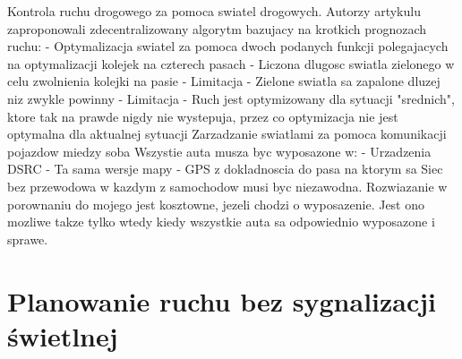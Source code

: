 \newline
\newline
Kontrola ruchu drogowego za pomoca swiatel drogowych. Autorzy artykulu \cite{lammer2008self} zaproponowali zdecentralizowany algorytm bazujacy na krotkich prognozach ruchu:
  \newline
  - Optymalizacja swiatel za pomoca dwoch podanych funkcji polegajacych na optymalizacji kolejek na czterech pasach
  - Liczona dlugosc swiatla zielonego w celu zwolnienia kolejki na pasie
  \newline
  - Limitacja - Zielone swiatla sa zapalone dluzej niz zwykle powinny
  \newline
  - Limitacja - Ruch jest optymizowany dla sytuacji "srednich", ktore tak na prawde nigdy nie wystepuja, przez co optymizacja nie jest optymalna dla aktualnej sytuacji
  \newline
  \newline
Zarzadzanie swiatlami za pomoca komunikacji pojazdow miedzy soba \cite{ferreira2010self}
\newline
Wszystie auta musza byc wyposazone w:
\newline
  - Urzadzenia DSRC
\newline
  - Ta sama wersje mapy
\newline
  - GPS z dokladnoscia do pasa na ktorym sa
\newline
Siec bez przewodowa w kazdym z samochodow musi byc niezawodna.
\newline
Rozwiazanie w porownaniu do mojego jest kosztowne, jezeli chodzi o wyposazenie. Jest ono mozliwe takze tylko wtedy kiedy wszystkie auta sa odpowiednio wyposazone i sprawe.
    
\section{Planowanie ruchu bez sygnalizacji świetlnej}

